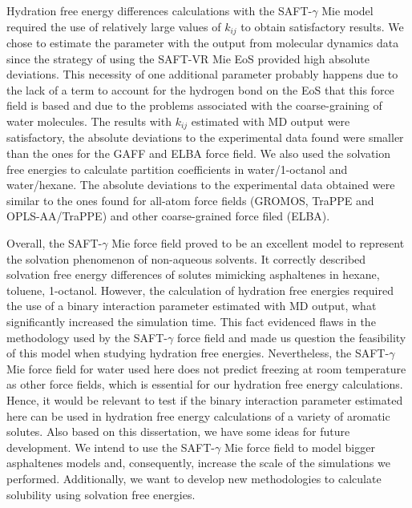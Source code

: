 Hydration free energy differences calculations with the SAFT-$\gamma$ Mie model required the use of relatively large values of $k_{ij}$ to obtain satisfactory results. We chose to estimate the parameter with the output from molecular dynamics data since the strategy of using the SAFT-VR Mie EoS provided high absolute deviations. This necessity of one additional parameter probably happens due to the lack of a term to account for the hydrogen bond on the EoS that this force field is based and due to the problems associated with the coarse-graining of water molecules. The results with $k_{ij}$ estimated with MD output were satisfactory, the absolute deviations to the experimental data found were smaller than the ones for the GAFF and ELBA force field. We also used the solvation free energies to calculate partition coefficients in water/1-octanol and water/hexane. The absolute deviations to the experimental data obtained were similar to the ones found for all-atom force fields (GROMOS, TraPPE and OPLS-AA/TraPPE) and other coarse-grained force filed (ELBA).

Overall, the SAFT-$\gamma$ Mie force field proved to be an excellent model to represent the solvation phenomenon of non-aqueous solvents. It correctly described solvation free energy differences of solutes mimicking asphaltenes in hexane, toluene, 1-octanol. However, the calculation of hydration free energies required the use of a binary interaction parameter estimated with MD output, what significantly increased the simulation time. This fact evidenced flaws in the methodology used by the SAFT-$\gamma$ force field and made us question the feasibility of this model when studying hydration free energies. Nevertheless, the SAFT-$\gamma$ Mie force field for water used here does not predict freezing at room temperature as other force fields, which is essential for our hydration free energy calculations. Hence, it would be relevant to test if the binary interaction parameter estimated here can be used in hydration free energy calculations of a variety of aromatic solutes. Also based on this dissertation, we have some ideas for future development. We intend to use the SAFT-$\gamma$ Mie force field to model bigger asphaltenes models and, consequently, increase the scale of the simulations we performed. Additionally, we want to develop new methodologies to calculate solubility using solvation free energies.


